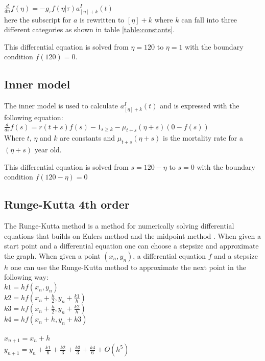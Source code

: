 $\frac{d}{dn}f(\eta) = -g_\tau f(\eta|\tau)a_{[\eta]+k}^I(t)$ \\

here the subscript for $a$ is rewritten to $[\eta]+k$ where $k$ can fall into three different categories as shown in table \ref{table:constants}. 

This differential equation is solved from $\eta = 120$ to $\eta = 1$ with the boundary condition $f(120) = 0$.

\subsection{Inner model}
The inner model is used to calculate $a_{[\eta]+k}^I(t)$ and is expressed with the following equation: \\

$\frac{d}{ds}f(s) = r(t+s)f(s) - 1_{s \geq k} - \mu_{t+s}(\eta + s)(0 - f(s))$ \\

Where $t$, $\eta$ and $k$ are constants and $\mu_{t+s}(\eta + s)$ is the mortality rate for a $(\eta + s)$ year old.

This differential equation is solved from $s = 120 - \eta$ to $s = 0$ with the boundary condition $f(120 - \eta) = 0$

\subsection{Runge-Kutta 4th order}
The Runge-Kutta method is a method for numerically solving differential equations that builds on Eulers method \cite{nric} and the midpoint method \cite{nric}. When given a start point and a differential equation one can choose a stepsize and approximate the graph.
When given a point $(x_n,y_n)$, a differential equation $f$ and a stepsize $h$ one can use the Runge-Kutta method to approximate the next point in the following way: \\

\noindent $k1 = h f(x_n, y_n)$ \\
$k2 = h f(x_n + \frac{h}{2}, y_n + \frac{k1}{h} )$ \\
$k3 = h f(x_n + \frac{h}{2}, y_n + \frac{k2}{h} )$ \\
$k4 = h f(x_n + h, y_n + k3 )$ \\ \\
$x_{n + 1} = x_n + h$ \\
$y_{n + 1} = y_n + \frac{k1}{6} + \frac{k2}{3} + \frac{k3}{3} + \frac{k4}{6} + O(h^5)$

